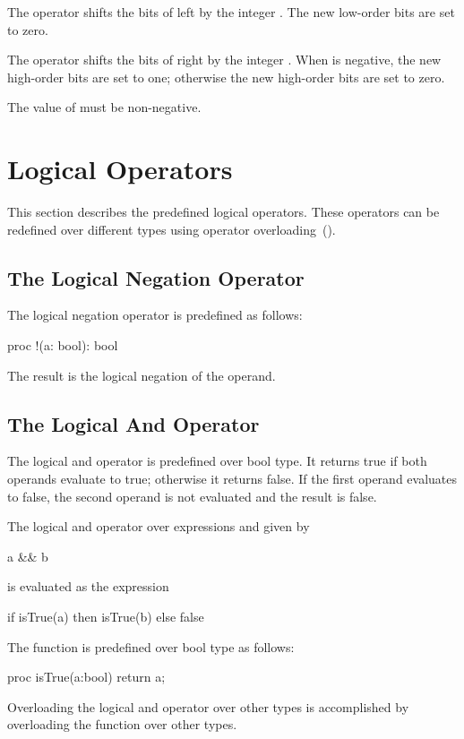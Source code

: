 The \chpl{<<} operator shifts the bits of  left by the
integer .  The new low-order bits are set to zero.

The \chpl{>>} operator shifts the bits of  right by the
integer .  When  is negative, the new high-order bits
are set to one; otherwise the new high-order bits are set to zero.

The value of  must be non-negative.

\section{Logical Operators}
\label{Logical_Operators}

This section describes the predefined logical operators.  These
operators can be redefined over different types using operator
overloading~().

\subsection{The Logical Negation Operator}
\label{Logical_Negation_Operators}

The logical negation operator is predefined as follows:
\begin{chapel}
proc !(a: bool): bool
\end{chapel}
The result is the logical negation of the operand.

\subsection{The Logical And Operator}
\label{Logical_And_Operators}

The logical and operator is predefined over bool type.  It returns
true if both operands evaluate to true; otherwise it returns false.
If the first operand evaluates to false, the second operand is not
evaluated and the result is false.

The logical and operator over expressions  and  given
by
\begin{chapel}
a && b
\end{chapel}
is evaluated as the expression
\begin{chapel}
if isTrue(a) then isTrue(b) else false
\end{chapel}

The function  is predefined over bool type as follows:
\begin{chapel}
proc isTrue(a:bool) return a;
\end{chapel}
Overloading the logical and operator over other types is accomplished
by overloading the  function over other types.

